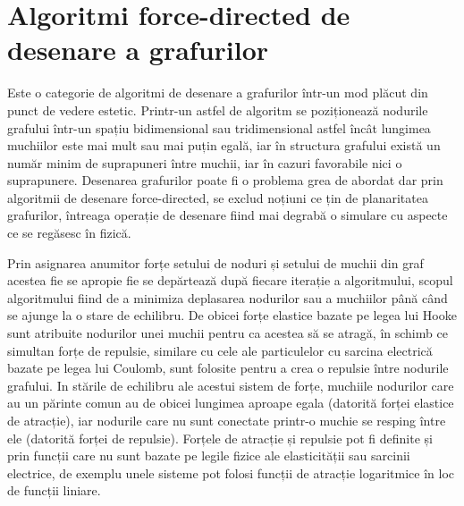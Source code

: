 \newpage
\section{Algoritmi force-directed de desenare a grafurilor}

Este o categorie de algoritmi de desenare a grafurilor într-un mod plăcut din punct de vedere estetic. 
Printr-un astfel de algoritm se poziționează nodurile grafului într-un spațiu bidimensional sau tridimensional astfel încât 
lungimea muchiilor este mai mult sau mai puțin egală, iar în structura grafului există un număr minim de suprapuneri între muchii, 
iar în cazuri favorabile nici o suprapunere. Desenarea grafurilor poate fi o problema grea de abordat dar prin algoritmii 
de desenare force-directed, se exclud noțiuni ce țin de planaritatea grafurilor, întreaga operație de desenare fiind mai 
degrabă o simulare cu aspecte ce se regăsesc în fizică.\newline

Prin asignarea anumitor forțe setului de noduri și setului de muchii din graf acestea fie se apropie fie se depărtează după 
fiecare iterație a algoritmului, scopul algoritmului fiind de a minimiza deplasarea nodurilor sau a muchiilor până când se 
ajunge la o stare de echilibru. De obicei forțe elastice bazate pe legea lui Hooke sunt atribuite nodurilor unei muchii 
pentru ca acestea să se atragă, în schimb ce simultan forțe de repulsie, similare cu cele ale particulelor cu sarcina electrică 
bazate pe legea lui Coulomb, sunt folosite pentru a crea o repulsie între nodurile grafului. In stările de echilibru ale acestui sistem de forțe, 
muchiile nodurilor care au un părinte comun au de obicei lungimea aproape egala (datorită forței elastice de atracție), 
iar nodurile care nu sunt conectate printr-o muchie se resping între ele (datorită forței de repulsie). Forțele de atracție și repulsie pot fi definite și prin funcții 
care nu sunt bazate pe legile fizice ale elasticității sau sarcinii electrice, de exemplu unele sisteme pot folosi funcții de 
atracție logaritmice în loc de funcții liniare. \newline

